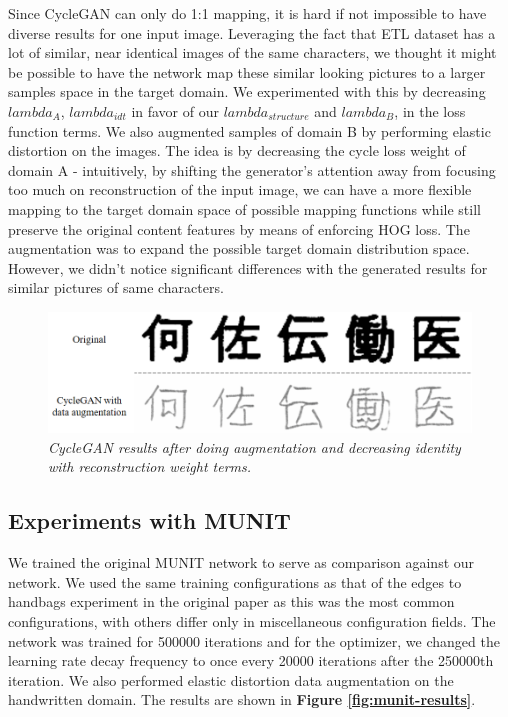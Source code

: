 \documentclass[12pt]{report}
\begin{document}
Since CycleGAN can only do 1:1 mapping, it is hard if not impossible to have diverse results for one input image. Leveraging the fact that ETL dataset has a lot of similar, near identical images of the same characters, we thought it might be possible to have the network map these similar looking pictures to a larger samples space in the target domain. We experimented with this by decreasing $lambda_A$, $lambda_{idt}$ in favor of our $lambda_{structure}$ and $lambda_B$, in the loss function terms. We also augmented samples of domain B by performing elastic distortion on the images. The idea is by decreasing the cycle loss weight of domain A - intuitively, by shifting the generator's attention away from focusing too much on reconstruction of the input image, we can have a more flexible mapping to the target domain space of possible mapping functions while still preserve the original content features by means of enforcing HOG loss. The augmentation was to expand the possible target domain distribution space. However, we didn't notice significant differences with the generated results for similar pictures of same characters.

\begin{figure}[h]
	\centering
	\includegraphics[scale=0.6]{augment-example}
	\caption{\textit{CycleGAN results after doing augmentation and decreasing identity with reconstruction weight terms.}}
	\label{fig:augment-example}
\end{figure}

\subsection{Experiments with MUNIT}

We trained the original MUNIT\cite{munit} network to serve as comparison against our network. We used the same training configurations as that of the edges to handbags experiment in the original paper as this was the most common configurations, with others differ only in miscellaneous configuration fields. The network was trained for 500000 iterations and for the optimizer, we changed the learning rate decay frequency to once every 20000 iterations after the 250000th iteration. We also performed elastic distortion data augmentation on the handwritten domain. The results are shown in \textbf{Figure \ref{fig:munit-results}}.
\end{document}
